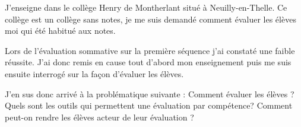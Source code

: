 
J'enseigne dans le collège Henry de Montherlant situé à Neuilly-en-Thelle.
Ce collège est un collège sans notes, je me suis demandé comment évaluer les élèves moi qui été habitué aux notes.

Lors de l'évaluation sommative sur la première séquence j'ai constaté une faible réussite. J'ai donc remis en cause tout d'abord mon enseignement puis me suis ensuite interrogé sur la façon d'évaluer les élèves.

J'en sus donc arrivé à la problématique suivante : 
Comment évaluer les élèves ?
Quels sont les outils qui permettent une évaluation par compétence?
Comment peut-on rendre les élèves acteur de leur évaluation ?

